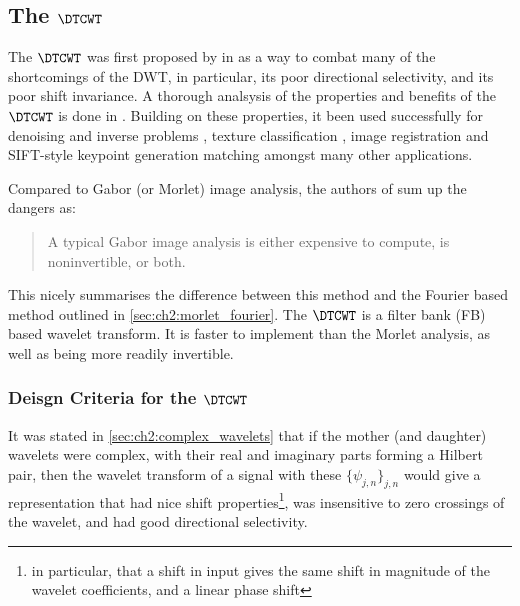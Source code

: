 \subsection{The $\DTCWT$}
  The $\DTCWT$ was first proposed by \citeauthor{kingsbury_dual-tree_1998} in
  \cite{kingsbury_dual-tree_1998, kingsbury_dual-tree_1998-1} as a way to combat
  many of the shortcomings of the DWT, in particular, its poor directional
  selectivity, and its poor shift invariance. A thorough analsysis of the
  properties and benefits of the $\DTCWT$ is done in
  \cite{kingsbury_image_1999,selesnick_dual-tree_2005}. Building on these
  properties, it been used
  successfully for denoising and inverse problems \cite{rivaz_bayesian_2001,
  zhang_bayesian_2008, zhang_variational_2015, miller_image_2008}, texture
  classification \cite{hatipoglu_texture_1999, rivaz_complex_1999}, image
  registration \cite{loo_motion-estimation-based_2001, chen_efficient_2012}
  and
  SIFT-style keypoint generation matching \cite{fauqueur_multiscale_2006,
  anderson_determining_2005, anderson_rotation-invariant_2006,
  bendale_multiscale_2010, ng_robust_2012} amongst many other applications. 

  Compared to Gabor (or Morlet) image analysis, the authors of
  \cite{selesnick_dual-tree_2005} sum up the dangers as:
  \begin{quote}
    A typical Gabor image analysis is either expensive to compute, is
    noninvertible, or both.
  \end{quote}
  This nicely summarises the difference between this method and the Fourier
  based method outlined in \autoref{sec:ch2:morlet_fourier}. The $\DTCWT$ is
  a filter bank (FB) based wavelet transform. It is faster
  to implement than the Morlet analysis, as well as being more readily invertible.

\subsubsection{Deisgn Criteria for the $\DTCWT$}
  It was stated in
  \autoref{sec:ch2:complex_wavelets} that if the mother (and daughter) wavelets
  were complex, with their real and imaginary parts forming a Hilbert pair,
  then the wavelet transform of a signal with these $\{\psi_{j,n}\}_{j,n}$
  would give a representation that had nice shift properties\footnote{in
  particular, that a shift in input gives the same shift in magnitude of the
  wavelet coefficients, and a linear phase shift}, was insensitive to zero crossings of the
  wavelet, and had good directional selectivity. 
  

